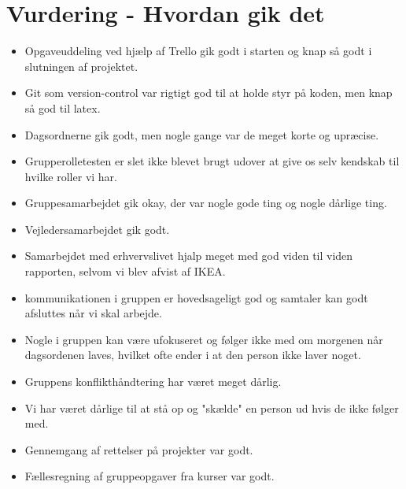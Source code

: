 \documentclass[oneside,a4paper,titlepage]{article}
\begin{document}


\section{Vurdering - Hvordan gik det}
\begin{itemize}
  \item Opgaveuddeling ved hjælp af Trello gik godt i starten og knap så godt i slutningen af projektet.
  \item Git som version-control var rigtigt god til at holde styr på koden, men knap så god til latex.
  \item Dagsordnerne gik godt, men nogle gange var de meget korte og upræcise.
  \item Grupperolletesten er slet ikke blevet brugt udover at give os selv kendskab til hvilke roller vi har.
  \item Gruppesamarbejdet gik okay, der var nogle gode ting og nogle dårlige ting. 
  \item Vejledersamarbejdet gik godt.
  \item Samarbejdet med erhvervslivet hjalp meget med god viden til viden rapporten, selvom vi blev afvist af IKEA.
  \item kommunikationen i gruppen er hovedsageligt god og samtaler kan godt afsluttes når vi skal arbejde. 
  \item Nogle i gruppen kan være ufokuseret og følger ikke med om morgenen når dagsordenen laves, hvilket ofte ender i at den person ikke laver noget.
  \item Gruppens konflikthåndtering har været meget dårlig.
  \item Vi har været dårlige til at stå op og "skælde" en person ud hvis de ikke følger med.
  \item Gennemgang af rettelser på projekter var godt.
  \item Fællesregning af gruppeopgaver fra kurser var godt.
\end{itemize}

\end{document}
